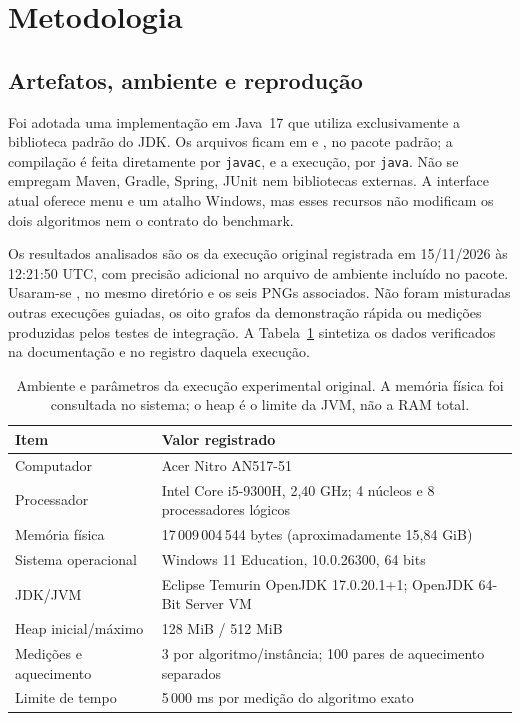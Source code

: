 \section{Metodologia}
\label{sec:methodology}

\subsection{Artefatos, ambiente e reprodução}

Foi adotada uma implementação em Java~17 que utiliza exclusivamente a
biblioteca padrão do JDK. Os arquivos ficam em  e
, no pacote padrão; a compilação é feita diretamente por
\texttt{javac}, e a execução, por \texttt{java}. Não se empregam Maven,
Gradle, Spring, JUnit nem bibliotecas externas. A interface atual
oferece menu e um atalho Windows, mas esses recursos não modificam
os dois algoritmos nem o contrato do benchmark.

Os resultados analisados são os da execução original registrada em
15/11/2026 às 12:21:50 UTC, com precisão adicional no arquivo de
ambiente incluído no pacote. Usaram-se ,
 no mesmo diretório e os seis PNGs associados.
Não foram misturadas outras execuções guiadas, os oito grafos da
demonstração rápida ou medições produzidas pelos testes de integração.
A Tabela~\ref{tab:environment} sintetiza os dados verificados na
documentação e no registro daquela execução.

\begin{table}[htbp]
\centering
\caption{Ambiente e parâmetros da execução experimental original. A memória física foi consultada no sistema; o heap é o limite da JVM, não a RAM total.}
\label{tab:environment}
\small
\begin{tabular}{p{}p{}}
\toprule
Item & Valor registrado \\
\midrule
Computador & Acer Nitro AN517-51 \\
Processador & Intel Core i5-9300H, 2,40 GHz; 4 núcleos e 8 processadores lógicos \\
Memória física & 17\,009\,004\,544 bytes (aproximadamente 15,84 GiB) \\
Sistema operacional & Windows 11 Education, 10.0.26300, 64 bits \\
JDK/JVM & Eclipse Temurin OpenJDK 17.0.20.1+1; OpenJDK 64-Bit Server VM \\
Heap inicial/máximo & 128 MiB / 512 MiB \\
Medições e aquecimento & 3 por algoritmo/instância; 100 pares de aquecimento separados \\
Limite de tempo & 5\,000 ms por medição do algoritmo exato \\
\bottomrule
\end{tabular}
\end{table}

